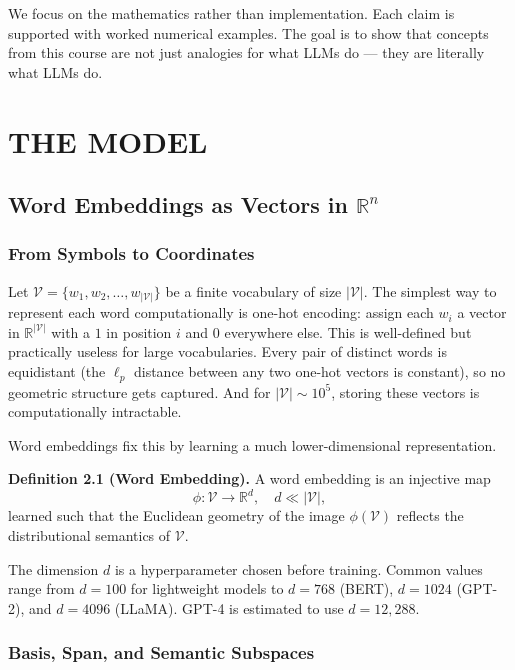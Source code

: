 \documentclass[12pt,a4paper]{article}
\begin{document}
We focus on the mathematics rather than implementation. Each claim is supported with worked
numerical examples. The goal is to show that concepts from this course are not just analogies
for what LLMs do --- they are literally what LLMs do.

\section{THE MODEL}

\subsection{Word Embeddings as Vectors in $\mathbb{R}^n$}

\subsubsection{From Symbols to Coordinates}

Let $\mathcal{V} = \{w_1, w_2, \ldots, w_{|\mathcal{V}|}\}$ be a finite vocabulary of size
$|\mathcal{V}|$. The simplest way to represent each word computationally is one-hot encoding:
assign each $w_i$ a vector in $\mathbb{R}^{|\mathcal{V}|}$ with a $1$ in position $i$ and
$0$ everywhere else. This is well-defined but practically useless for large vocabularies. Every
pair of distinct words is equidistant (the $\ell_p$ distance between any two one-hot vectors
is constant), so no geometric structure gets captured. And for $|\mathcal{V}| \sim 10^5$,
storing these vectors is computationally intractable.

Word embeddings fix this by learning a much lower-dimensional representation.

\textbf{Definition 2.1 (Word Embedding).} A word embedding is an injective map
\begin{equation}
    \phi : \mathcal{V} \rightarrow \mathbb{R}^d, \quad d \ll |\mathcal{V}|,
\end{equation}
learned such that the Euclidean geometry of the image $\phi(\mathcal{V})$ reflects the
distributional semantics of $\mathcal{V}$.

The dimension $d$ is a hyperparameter chosen before training. Common values range from
$d = 100$ for lightweight models to $d = 768$ (BERT), $d = 1024$ (GPT-2), and $d = 4096$
(LLaMA). GPT-4 is estimated to use $d = 12{,}288$.

\subsubsection{Basis, Span, and Semantic Subspaces}
\end{document}
